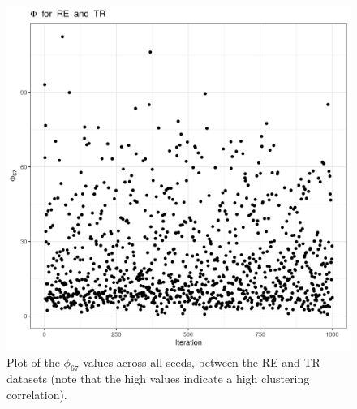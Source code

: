 \documentclass[12pt]{article} %
\begin{document}
	\newpage
	
	\begin{figure}[h]
		\centering
		\includegraphics[scale=0.75]{Images/Biology_data/Set_250/All_datasets/Phi_series_plots/file_1_Phi_67.png}
		\caption{Plot of the $\phi_{67}$ values across all seeds, between the RE and TR datasets (note that the high values indicate a high clustering correlation).}
		\label{fig:results:cedar_1:mdi_re_tr_phi_series_plot}
	\end{figure}

	\newpage
	
	
	
%
\end{document}
